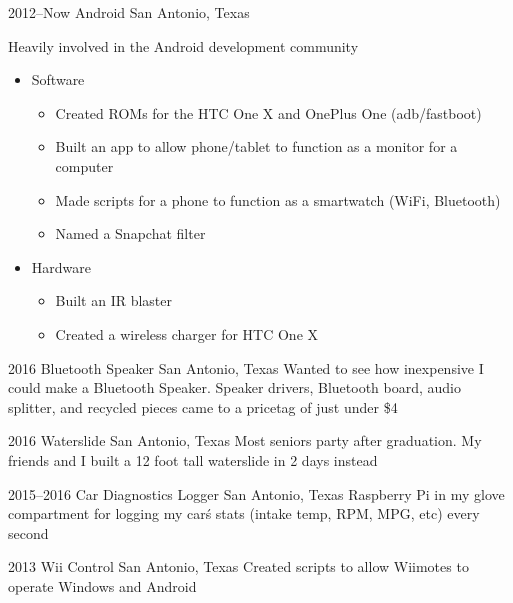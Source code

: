 \documentclass[]{friggeri-cv} %
\begin{document}
\begin{entrylist}

	\entry
	{2012--Now}
	{Android}
	{San Antonio, Texas}
	{Heavily involved in the Android development community
		\begin{itemize}
			\item Software
				\begin{itemize}
					\item Created ROMs for the HTC One X and OnePlus One (adb/fastboot)
					\item Built an app to allow phone/tablet to function as a  monitor for a computer
					\item Made scripts for a phone to function as a smartwatch (WiFi, Bluetooth)
					\item Named a Snapchat filter
				\end{itemize}
			\item Hardware
				\begin{itemize}
					\item Built an IR blaster
					\item Created a wireless charger for HTC One X
				\end{itemize}
		\end{itemize}
	}


	\entry
	{2016}
	{Bluetooth Speaker}
	{San Antonio, Texas}
	{Wanted to see how inexpensive I could make a Bluetooth Speaker. Speaker drivers, Bluetooth board, audio splitter, and recycled pieces came to a pricetag of just under \$4}


	\entry
	{2016}
	{Waterslide}
	{San Antonio, Texas}
	{Most seniors party after graduation. My friends and I built a 12 foot tall waterslide in 2 days instead}


	\entry
	{2015--2016}
	{Car Diagnostics Logger}
	{San Antonio, Texas}
	{Raspberry Pi in my glove compartment for logging my car\'s stats (intake temp, RPM, MPG, etc) every  second}


	\entry
	{2013}
	{Wii Control}
	{San Antonio, Texas}
	{Created scripts to allow Wiimotes to operate Windows and Android}



\end{entrylist}
\end{document}
